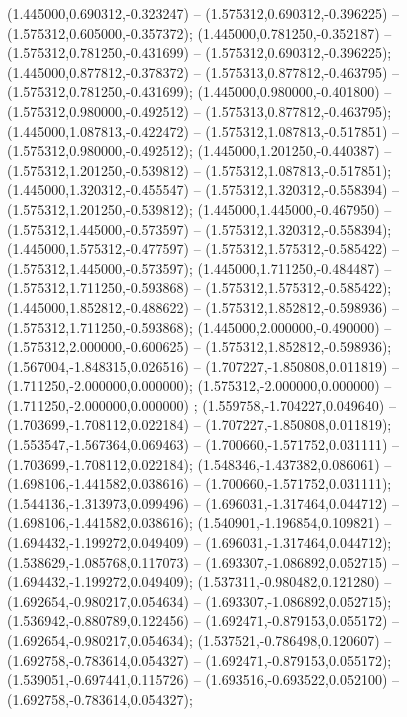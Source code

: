  (1.445000,0.690312,-0.323247) -- (1.575312,0.690312,-0.396225) -- (1.575312,0.605000,-0.357372);
 (1.445000,0.781250,-0.352187) -- (1.575312,0.781250,-0.431699) -- (1.575312,0.690312,-0.396225);
 (1.445000,0.877812,-0.378372) -- (1.575313,0.877812,-0.463795) -- (1.575312,0.781250,-0.431699);
 (1.445000,0.980000,-0.401800) -- (1.575312,0.980000,-0.492512) -- (1.575313,0.877812,-0.463795);
 (1.445000,1.087813,-0.422472) -- (1.575312,1.087813,-0.517851) -- (1.575312,0.980000,-0.492512);
 (1.445000,1.201250,-0.440387) -- (1.575312,1.201250,-0.539812) -- (1.575312,1.087813,-0.517851);
 (1.445000,1.320312,-0.455547) -- (1.575312,1.320312,-0.558394) -- (1.575312,1.201250,-0.539812);
 (1.445000,1.445000,-0.467950) -- (1.575312,1.445000,-0.573597) -- (1.575312,1.320312,-0.558394);
 (1.445000,1.575312,-0.477597) -- (1.575312,1.575312,-0.585422) -- (1.575312,1.445000,-0.573597);
 (1.445000,1.711250,-0.484487) -- (1.575312,1.711250,-0.593868) -- (1.575312,1.575312,-0.585422);
 (1.445000,1.852812,-0.488622) -- (1.575312,1.852812,-0.598936) -- (1.575312,1.711250,-0.593868);
 (1.445000,2.000000,-0.490000) -- (1.575312,2.000000,-0.600625) -- (1.575312,1.852812,-0.598936);
 (1.567004,-1.848315,0.026516) -- (1.707227,-1.850808,0.011819) -- (1.711250,-2.000000,0.000000);
 (1.575312,-2.000000,0.000000) -- (1.711250,-2.000000,0.000000) ;
 (1.559758,-1.704227,0.049640) -- (1.703699,-1.708112,0.022184) -- (1.707227,-1.850808,0.011819);
 (1.553547,-1.567364,0.069463) -- (1.700660,-1.571752,0.031111) -- (1.703699,-1.708112,0.022184);
 (1.548346,-1.437382,0.086061) -- (1.698106,-1.441582,0.038616) -- (1.700660,-1.571752,0.031111);
 (1.544136,-1.313973,0.099496) -- (1.696031,-1.317464,0.044712) -- (1.698106,-1.441582,0.038616);
 (1.540901,-1.196854,0.109821) -- (1.694432,-1.199272,0.049409) -- (1.696031,-1.317464,0.044712);
 (1.538629,-1.085768,0.117073) -- (1.693307,-1.086892,0.052715) -- (1.694432,-1.199272,0.049409);
 (1.537311,-0.980482,0.121280) -- (1.692654,-0.980217,0.054634) -- (1.693307,-1.086892,0.052715);
 (1.536942,-0.880789,0.122456) -- (1.692471,-0.879153,0.055172) -- (1.692654,-0.980217,0.054634);
 (1.537521,-0.786498,0.120607) -- (1.692758,-0.783614,0.054327) -- (1.692471,-0.879153,0.055172);
 (1.539051,-0.697441,0.115726) -- (1.693516,-0.693522,0.052100) -- (1.692758,-0.783614,0.054327);
